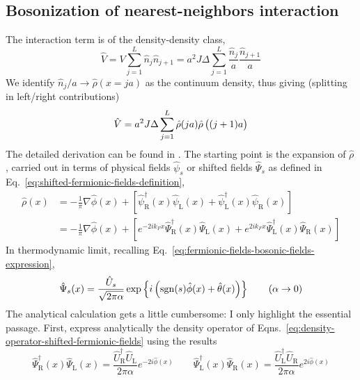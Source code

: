 \subsection{Bosonization of nearest-neighbors interaction}

The interaction term is of the density-density class,
\[
	\hat V = V \sum_{j=1}^L \hat n_j \hat n_{j+1} = a^2 J\Delta \sum_{j=1}^L \frac{\hat n_j}{a} \frac{\hat n_{j+1}}{a}
\]
We identify $\hat n_j/a \to \hat \rho(x=ja)$ as the continuum density, thus giving (splitting in left/right contributions)
\begin{equation}\label{eq:interaction-hamiltonian-lattice-density}
	\hat V = a^2 J\Delta \sum_{j=1}^L \hat \rho(ja) \hat \rho\left(
		\vphantom{A^A} (j+1)a
	\right)
\end{equation}
The detailed derivation can be found in \cite[Sec.~6.1.2]{giamarchi2003quantum}. The starting point is the expansion of $\hat \rho$, carried out in terms of physical fields $\hat \psi_s$ or shifted fields $\hat \Psi_s$ as defined in Eq.~\eqref{eq:shifted-fermionic-fields-definition},
\begin{equation}\label{eq:density-operator-shifted-fermionic-fields}
	\begin{aligned}
		\hat \rho(x) &= - \frac{1}{\pi} \nabla \hat \phi(x) + \left[
			\hat \psi_\mathrm{R}^\dagger(x) \hat \psi_\mathrm{L}(x) + \hat \psi_\mathrm{L}^\dagger(x) \hat \psi_\mathrm{R}(x) 
		\right] \\
		&= - \frac{1}{\pi} \nabla \hat \phi(x) + \left[
			e^{-2ik_F x}
			\hat \Psi_\mathrm{R}^\dagger(x) \hat \Psi_\mathrm{L}(x) + e^{2ik_F x} \hat \Psi_\mathrm{L}^\dagger(x) \hat \Psi_\mathrm{R}(x) 
		\right]
	\end{aligned}
\end{equation}
In thermodynamic limit, recalling Eq.~\eqref{eq:fermionic-fields-bosonic-fields-expression},
\[
	\hat \Psi_s (x) = \frac{\hat U_s}{\sqrt{2\pi\alpha}} \exp\left\{
		i \left(
			\mathrm{sgn}(s) \hat \phi(x) + \hat \theta(x)
		\right)
	\right\}
	\qquad\left( \alpha \to 0 \right)
\]
The analytical calculation gets a little cumbersome: I only highlight the essential passage. First, express analytically the density operator of Eqns.~\eqref{eq:density-operator-shifted-fermionic-fields} using the results
\[
	\hat \Psi_\mathrm{R}^\dagger(x) \hat \Psi_\mathrm{L}(x) = \frac{\hat U_\mathrm{R}^\dagger \hat U_\mathrm{L}}{2\pi\alpha} e^{-2i\hat \phi(x)}
	\qquad
	\hat \Psi_\mathrm{L}^\dagger(x) \hat \Psi_\mathrm{R}(x) = \frac{\hat U_\mathrm{L}^\dagger \hat U_\mathrm{R}}{2\pi\alpha} e^{2i\hat \phi(x)}
\]
